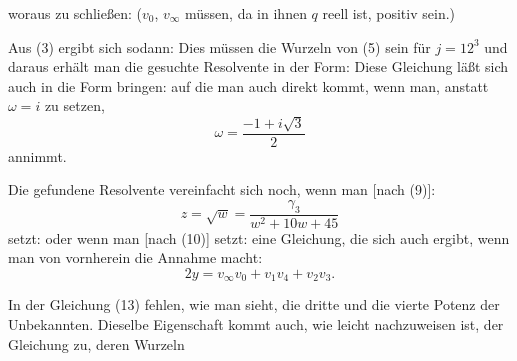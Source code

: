 woraus zu schließen:
($v_0$, $v_\infty$ müssen, da in ihnen $q$ reell ist, positiv sein.)

Aus (3) ergibt sich sodann:
Dies müssen die Wurzeln von (5) sein für $j=12^3$ und daraus erhält man die gesuchte Resolvente in der Form:
Diese Gleichung läßt sich auch in die Form bringen:
auf die man auch direkt kommt, wenn man, anstatt $\omega=i$ zu setzen,
\[ \omega = \frac{-1+i\sqrt3}{2} \]
annimmt.

Die gefundene Resolvente vereinfacht sich noch, wenn man [nach (9)]:
\[ z = \sqrt{w} = \frac{\gamma_3}{w^2+10w+45} \]
setzt:
oder wenn man [nach (10)]
setzt:
eine Gleichung, die sich auch ergibt, wenn man von vornherein die Annahme macht:
\[ 2y = v_\infty v_0 + v_1 v_4 + v_2 v_3. \]

In der Gleichung (13) fehlen, wie man sieht, die dritte und die vierte Potenz der Unbekannten. Dieselbe Eigenschaft kommt auch, wie leicht nachzuweisen ist, der Gleichung zu, deren Wurzeln
